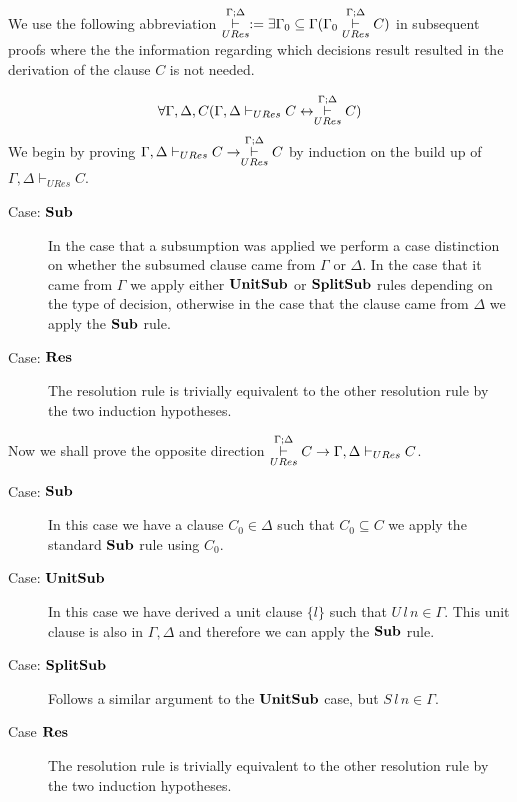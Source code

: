 \medskip
We use the following abbreviation $\overset{\Gamma;\Delta}{\underset{URes}{\vdash}} := \exists \Gamma_0 \subseteq \Gamma (\Gamma_0 \overset{\Gamma;\Delta}{\underset{URes}{\vdash}} C)$ in subsequent proofs where the the information regarding which decisions result resulted in the derivation of the clause $C$ is not needed. \\
\medskip
\begin{mytheorem}
\begin{align*}
\forall \Gamma,\Delta,C ( \Gamma,\Delta \vdash_{URes} C  \leftrightarrow   \overset{\Gamma;\Delta}{\underset{URes}{\vdash}} C )
\end{align*}
 We begin by proving $\Gamma,\Delta \vdash_{URes} C  \to   \overset{\Gamma;\Delta}{\underset{URes}{\vdash}} C$ by induction on the build up of $\Gamma, \Delta \vdash_{URes} C$.
\begin{description}

\item[Case: $\mathbf{Sub}$]
In the case that a subsumption was applied we perform a case distinction on whether the subsumed clause came from $\Gamma$ or $\Delta$. In the case that it came from $\Gamma$ we apply either $\mathbf{UnitSub}$ or $\mathbf{SplitSub}$ rules depending on the type of decision, otherwise in the case that the clause came from $\Delta$ we apply the $\mathbf{Sub}$ rule.
\item[Case: $\mathbf{Res}$]
The resolution rule is trivially equivalent to the other resolution rule by the two induction hypotheses.
\end{description}
Now we shall prove the opposite direction   $\overset{\Gamma;\Delta}{\underset{URes}{\vdash}} C \to \Gamma,\Delta \vdash_{URes} C $.
\begin{description}
\item[Case: $\mathbf{Sub}$]
In this case we have a clause $C_0 \in \Delta$ such that $C_0 \subseteq C$ we apply the standard $\mathbf{Sub}$ rule using $C_0$.
\item[Case: $\mathbf{UnitSub}$]
In this case we have derived a unit clause $\{ l \}$ such that $U \, l \, n \in \Gamma$. This unit clause is also in $\Gamma,\Delta$ and therefore we can apply the  $\mathbf{Sub}$ rule.
\item[Case: $\mathbf{SplitSub}$] 
Follows a similar argument to the $\mathbf{UnitSub}$ case, but $S \, l \, n \in \Gamma$.
\item[Case $\mathbf{Res}$]
The resolution rule is trivially equivalent to the other resolution rule by the two induction hypotheses.
\end{description}

\end{mytheorem}
\medskip
